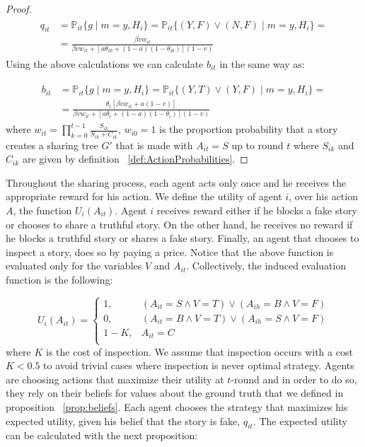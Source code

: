 \begin{proof}
\begin{align*}
	\begin{split}
		q_{it} & = \mathbb{P}_{it} \{g \mid m=y , H_i\} = \mathbb{P}_{it} \{(Y,F) \lor (N,F) \mid m=y , H_i\} = \\
		& = \frac{\beta v w_{it}}{\beta v w_{it} + [a \theta_{i0}+(1-a)(1-\theta_{i0})](1-v)}
	\end{split}	
\end{align*}
Using the above calculations we can calculate $b_{it}$ in the same way as:

\begin{align*}
	\begin{split}
		b_{it} & = \mathbb{P}_{it} \{g \mid m=y , H_i\} = \mathbb{P}_{it} \{(Y,T) \lor (Y,F) \mid m=y , H_i\} = \\
		& = \frac{\theta_i[\beta v w_{it}+a(1-v)]}{\beta v w_{it} + [a \theta_i + (1-a)(1-\theta_i)](1-v)}
	\end{split}	
\end{align*}
where $w_{it} = \displaystyle\prod_{k=0}^{t-1} \frac{S_{ik}}{S_{ik}+C_{ik}}$, $w_{i0} = 1$ is the proportion probability that a story creates a sharing tree $G'$ that is made with $A_{it} = S$ up to round $t$ where $S_{ik}$ and $C_{ik}$ are given by definition ~\ref{def:ActionProbabilities}.
 
\end{proof}

Throughout the sharing process, each agent acts only once and he receives the appropriate reward for his action. We define the utility of agent $i$, over his action $A$, the function $U_i(A_{it})$. Agent $i$ receives reward either if he blocks a fake story or chooses to share a truthful story. On the other hand, he receives no reward if he blocks a truthful story or shares a fake story. Finally, an agent that chooses to inspect a story, does so by paying a price. Notice that the above function is evaluated only for the variables $V$ and $A_{it}$. Collectively, the induced evaluation function is the following:

\begin{equation}
U_i(A_{it}) = 
\begin{cases}
	1, & (A_{it} = S \land V=T) \lor (A_{ih} = B \land V=F) \\
	0, & (A_{it} = B \land V=T) \lor (A_{ih} = S \land V=F) \\
	1-K, & A_{it} = C \\
\end{cases} 
\end{equation}
where $K$ is the cost of inspection. We assume that inspection occurs with a cost $K < 0.5$ to avoid trivial cases where inspection is never optimal strategy. Agents are choosing actions that maximize their utility at $t$-round and in order to do so, they rely on their beliefs for values about the ground truth that we defined in proposition ~\ref{prop:beliefs}. Each agent chooses the strategy that maximizes his expected utility, given his belief that the story is fake, $q_{it}$. The expected utility can be calculated with the next proposition: 

